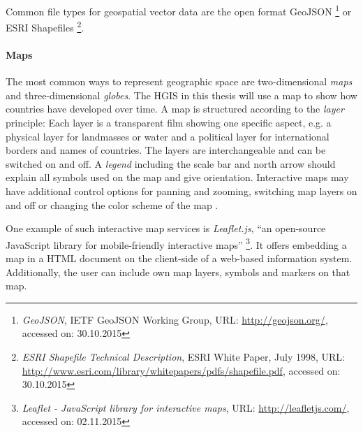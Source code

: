 Common file types for geospatial vector data are the open format GeoJSON
\footnote{
  \emph{GeoJSON},
  IETF GeoJSON Working Group,
  URL: \url{http://geojson.org/},
  accessed on: 30.10.2015
}
or ESRI Shapefiles
\footnote{
  \emph{ESRI Shapefile Technical Description},
  ESRI White Paper, July 1998,
  URL: \url{http://www.esri.com/library/whitepapers/pdfs/shapefile.pdf},
  accessed on: 30.10.2015
}.


\paragraph{Maps} %
\label{par:maps}

The most common ways to represent geographic space are two-dimensional \emph{maps} and three-dimensional \emph{globes}. The HGIS in this thesis will use a map to show how countries have developed over time. A map is structured according to the \emph{layer} principle: Each layer is a transparent film showing one specific aspect, e.g. a physical layer for landmasses or water and a political layer for international borders and names of countries. The layers are interchangeable and can be switched on and off. A \emph{legend} including the scale bar and north arrow should explain all symbols used on the map and give orientation. Interactive maps may have additional control options for panning and zooming, switching map layers on and off or changing the color scheme of the map
\cite[pp. 159-166]{bolstad2008gis}.

One example of such interactive map services is \emph{Leaflet.js}, ``an open-source JavaScript library for mobile-friendly interactive maps''
\footnote{
  \textit{Leaflet - JavaScript library for interactive maps},
  URL: \url{http://leafletjs.com/},
  accessed on: 02.11.2015
}.
It offers embedding a map in a HTML document on the client-side of a web-based information system. Additionally, the user can include own map layers, symbols and markers on that map.

